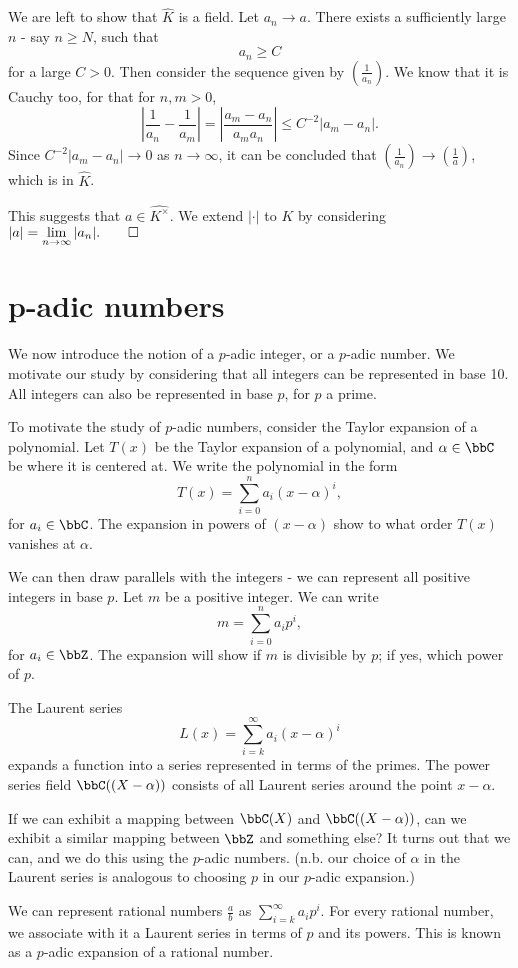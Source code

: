 \documentclass[a4paper, 12pt,oneside,openany]{book}
\begin{document}
We are left to show that $\hat{K}$ is a field. Let $a_n \to a$. There exists a sufficiently large $n$ - say $n\geq N$, such that $$a_n \geq C$$ for a large $C>0$. Then consider the sequence given by $(\frac{1}{a_n})$. We know that it is Cauchy too, for that for $n, m>0$, $$\left|\frac{1}{a_n}-\frac{1}{a_m}\right|=\left|\frac{a_m-a_n}{a_ma_n}\right|\leq C^{-2} |a_m-a_n|.$$ Since $C^{-2} |a_m-a_n| \to 0$ as $n\to \infty$, it can be concluded that $(\frac{1}{a_n})\to(\frac{1}{a})$, which is in $\hat{K}$.

This suggests that $a \in \hat{K^\times}$. We extend $|\cdot|$ to $K$ by considering $|a|=\lim\limits_{n\to\infty} |a_n|. \qed$

\section{p-adic numbers}

We now introduce the notion of a $p$-adic integer, or a $p$-adic number. We motivate our study by considering that all integers can be represented in base 10. All integers can also be represented in base $p$, for $p$ a prime.

To motivate the study of $p$-adic numbers, consider the Taylor expansion of a polynomial. Let $T(x)$ be the Taylor expansion of a polynomial, and $\alpha\in\bbC$ be where it is centered at. We write the polynomial in the form $$T(x)=\sum\limits_{i=0}^n a_i(x-\alpha)^i,$$ for $a_i \in \bbC$. The expansion in powers of $(x-\alpha)$ show to what order $T(x)$ vanishes at $\alpha$.

We can then draw parallels with the integers - we can represent all positive integers in base $p$. Let $m$ be a positive integer. We can write $$m=\sum\limits_{i=0}^n a_ip^i,$$ for $a_i\in\bbZ$. The expansion will show if $m$ is divisible by $p$; if yes, which power of $p$.

The Laurent series $$L(x)=\sum\limits_{i=k}^\infty a_i(x-\alpha)^i$$ expands a function into a series represented in terms of the primes. The power series field $\bbC((X-\alpha))$ consists of all Laurent series around the point $x-\alpha$. 

If we can exhibit a mapping between $\bbC(X)$ and $\bbC((X-\alpha))$, can we exhibit a similar mapping between $\bbZ$ and something else? It turns out that we can, and we do this using the $p$-adic numbers. (n.b. our choice of $\alpha$ in the Laurent series is analogous to choosing $p$ in our $p$-adic expansion.)

We can represent rational numbers $\frac{a}{b}$ as $\sum_{i=k}^{\infty} a_ip^i$. For every rational number, we associate with it a Laurent series in terms of $p$ and its powers. This is known as a $p$-adic expansion of a rational number. 
\end{document}
